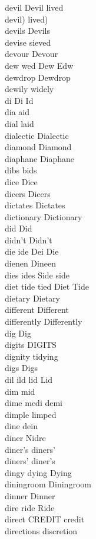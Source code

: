 devil Devil lived\\
devil) lived)\\
devils Devils\\
devise sieved\\
devour Devour\\
dew wed Dew Edw\\
dewdrop Dewdrop\\
dewily widely\\
di Di Id\\
dia aid\\
dial laid\\
dialectic Dialectic\\
diamond Diamond\\
diaphane Diaphane\\
dibs bids\\
dice Dice\\
dicers Dicers\\
dictates Dictates\\
dictionary Dictionary\\
did Did\\
didn't Didn't\\
die ide Dei Die\\
dienen Dineen\\
dies ides Side side\\
diet tide tied Diet Tide\\
dietary Dietary\\
different Different\\
differently Differently\\
dig Dig\\
digits DIGITS\\
dignity tidying\\
digs Digs\\
dil ild lid Lid\\
dim mid\\
dime medi demi\\
dimple limped\\
dine dein\\
diner Nidre\\
diner's diners'\\
diners' diner's\\
dingy dying Dying\\
diningroom Diningroom\\
dinner Dinner\\
dire ride Ride\\
direct CREDIT credit\\
directions discretion\\
